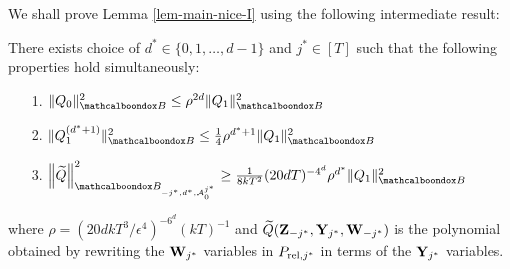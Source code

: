We shall prove Lemma \ref{lem-main-nice-I} using the following intermediate result:
\begin{lemma}					\label{thm:goodj}
There exists choice of $d^* \in \{0,1,\ldots,d-1\}$ and $j^* \in [T]$ such that the following properties hold simultaneously:
	\begin{itemize}
		\item[1.] $\|Q_0\|^2_\basisA \le \rho^{2d}\|Q_1\|^2_\basisA$
		\item[2.] $\|Q_1^{(d^* + 1)}\|^2_\basisA \le \frac14\rho^{d^* + 1}\|Q_1\|^2_\basisA$
		\item[3.] $\Big\|\Wq\Big\|^2_{\mcb{B}_{-j^*,d^*, \mc{A}^{j^*}_0}} \ge \frac{1}{8kT^2}(20dT)^{-4^d}\rho^{d^*}\|Q_1\|^2_\basisA$
	\end{itemize}
	
	\noindent where  $\rho = (20dkT^3/\epsilon^4)^{-6^d}(kT)^{-1}$ and $\Wq({\bf Z}_{-j^*},{\bf Y}_{j^*},{\bf W}_{-j^*})$ is the polynomial obtained by rewriting the ${\bf W}_{j^*}$ variables in $P_{{\rm rel},j^*}$
in terms of the ${\bf Y}_{j^*}$ variables. 
\end{lemma}


